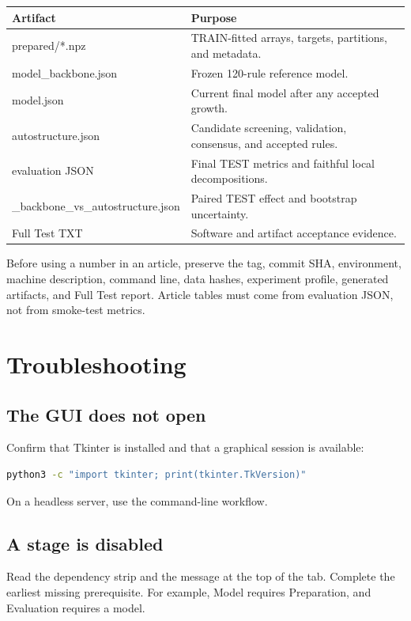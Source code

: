 \documentclass[11pt,a4paper]{article}
\begin{document}
\begin{tabularx}{\textwidth}{>{\ttfamily\footnotesize}p{} X}
\toprule
\normalfont\bfseries Artifact & \bfseries Purpose \\
\midrule
prepared/*.npz & TRAIN-fitted arrays, targets, partitions, and metadata. \\
model\_backbone.json & Frozen 120-rule reference model. \\
model.json & Current final model after any accepted growth. \\
autostructure.json & Candidate screening, validation, consensus, and accepted rules. \\
evaluation JSON & Final TEST metrics and faithful local decompositions. \\
*\_backbone\_vs\_autostructure.json & Paired TEST effect and bootstrap uncertainty. \\
Full Test TXT & Software and artifact acceptance evidence. \\
\bottomrule
\end{tabularx}

Before using a number in an article, preserve the tag, commit SHA, environment,
machine description, command line, data hashes, experiment profile, generated
artifacts, and Full Test report. Article tables must come from evaluation JSON,
not from smoke-test metrics.

\section{Troubleshooting}

\subsection*{The GUI does not open}

Confirm that Tkinter is installed and that a graphical session is available:

\begin{lstlisting}[language=bash]
python3 -c "import tkinter; print(tkinter.TkVersion)"
\end{lstlisting}

On a headless server, use the command-line workflow.

\subsection*{A stage is disabled}

Read the dependency strip and the message at the top of the tab. Complete the
earliest missing prerequisite. For example, Model requires Preparation, and
Evaluation requires a model.
\end{document}
